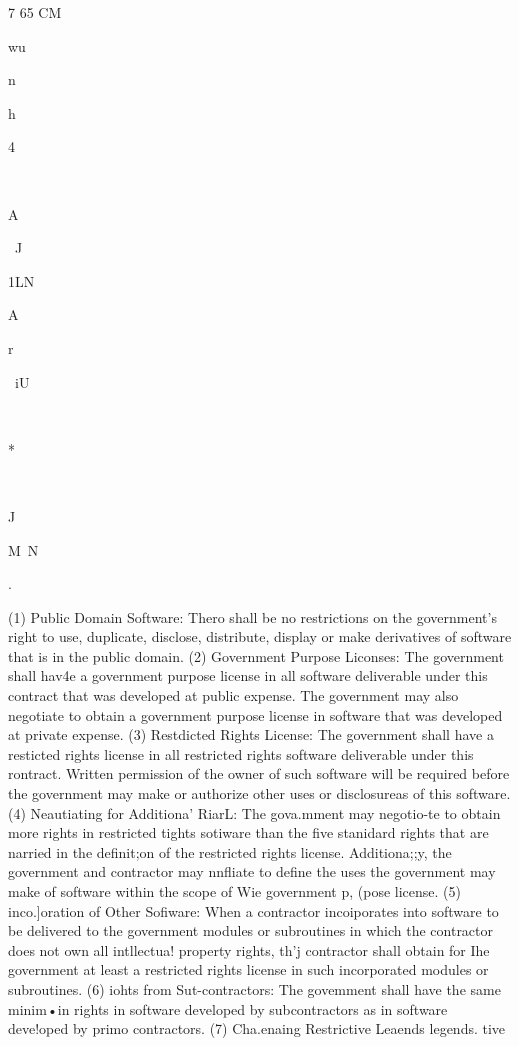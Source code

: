 \documentclass[12pt]{article}
\begin{document}
7
65
CM

wu~

n

h

4

~~

A

~J

1LN

A

r

~iU

~

*

~

J

M~N

.

(1) Public Domain Software: Thero shall be no restrictions
on the government's right to use, duplicate, disclose, distribute, display or make derivatives of software that is in the public domain.
(2) Government Purpose Liconses: The government shall hav4e a government purpose license in all software deliverable under this contract that was developed at public expense. The
government may also negotiate to obtain a government purpose license in software that was developed at private expense.
(3) Restdicted Rights License: The government shall have a resticted rights license in all
restricted rights software deliverable under this rontract. Written permission of the owner of such
software will be required before the government may make or authorize other uses or disclosureas of
this software.
(4) Neautiating for Additiona' RiarL: The gova.mment may negotio-te to obtain more rights
in restricted tights sotiware than the five stanidard rights that are narried in the definit;on of the
restricted rights license. Additiona;;y, the government and contractor may nnfliate to define the
uses the government may make of software within the scope of Wie government p, (pose license.
(5) inco.]oration of Other Sofiware: When a contractor incoiporates into software to be
delivered to the government modules or subroutines in which the contractor does not own all intllectua! property rights, th'j contractor shall obtain for Ihe government at least a restricted rights license in such incorporated modules or subroutines.
(6) iohts from Sut-contractors: The govemment shall have the same minim•in rights in
software developed by subcontractors as in software deve!oped by primo contractors.
(7) Cha.enaing Restrictive Leaends
legends.
tive
\end{document}
